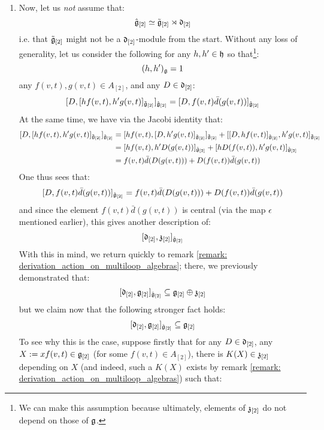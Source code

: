 \begin{remark}
\begin{enumerate}
                \item Now, let us \textit{not} assume that:
                    $$\hat{\mathfrak{g}}_{[2]} \simeq \tilde{\mathfrak{g}}_{[2]}\rtimes \mathfrak{d}_{[2]}$$
                i.e. that $\tilde{\mathfrak{g}}_{[2]}$ might not be a $\mathfrak{d}_{[2]}$-module from the start. Without any loss of generality, let us consider the following for any $h, h' \in \mathfrak{h}$ so that\footnote{We can make this assumption because ultimately, elements of $\mathfrak{z}_{[2]}$ do not depend on those of $\mathfrak{g}$.}:
                    $$(h, h')_{\mathfrak{g}} = 1$$
                any $f(v, t), g(v, t) \in A_{[2]}$, and any $D \in \mathfrak{d}_{[2]}$:
                    $$[ D, [h f(v, t), h' g(v, t)]_{\tilde{\mathfrak{g}}_{[2]}} ]_{\hat{\mathfrak{g}}_{[2]}} = [ D, f(v, t) \bar{d}( g(v, t) ) ]_{\hat{\mathfrak{g}}_{[2]}}$$
                At the same time, we have via the Jacobi identity that:
                    $$
                        \begin{aligned}
                            [ D, [h f(v, t), h' g(v, t)]_{\tilde{\g}_{[2]}} ]_{\hat{\g}_{[2]}} & = [ h f(v, t), [D, h' g(v, t)]_{\hat{\g}_{[2]}} ]_{\tilde{\g}_{[2]}} + [ [D, h f(v, t)]_{\hat{\g}_{[2]}}, h' g(v, t) ]_{\tilde{\g}_{[2]}}
                            \\
                            & = [ h f(v, t), h' D( g(v, t) ) ]_{\tilde{\g}_{[2]}} + [ h D( f(v, t) ), h' g(v, t) ]_{\tilde{\g}_{[2]}}
                            \\
                            & = f(v, t) \bar{d}( D( g(v, t) ) ) + D( f(v, t) ) \bar{d}(g(v, t))
                        \end{aligned}
                    $$
                One thus sees that:
                    $$[ D, f(v, t) \bar{d}( g(v, t) ) ]_{\hat{\mathfrak{g}}_{[2]}} = f(v, t) \bar{d}( D( g(v, t) ) ) + D( f(v, t) ) \bar{d}(g(v, t))$$
                and since the element $f(v, t) \bar{d}( g(v, t) )$ is central (via the map $\epsilon$ mentioned earlier), this gives another description of:
                    $$[ \mathfrak{d}_{[2]}, \mathfrak{z}_{[2]} ]_{\hat{\mathfrak{g}}_{[2]}}$$
                With this in mind, we return quickly to remark \ref{remark: derivation_action_on_multiloop_algebras}; there, we previously demonstrated that:
                    $$[ \mathfrak{d}_{[2]}, \mathfrak{g}_{[2]} ]_{\hat{\mathfrak{g}}_{[2]}} \subseteq \mathfrak{g}_{[2]} \oplus \mathfrak{z}_{[2]}$$
                but we claim now that the following stronger fact holds:
                    $$[ \mathfrak{d}_{[2]}, \mathfrak{g}_{[2]} ]_{\hat{\mathfrak{g}}_{[2]}} \subseteq \mathfrak{g}_{[2]}$$
                To see why this is the case, suppose firstly that for any $D \in \mathfrak{d}_{[2]}$, any $X := x f(v, t) \in \mathfrak{g}_{[2]}$ (for some $f(v, t) \in A_{[2]}$), there is $K(X) \in \mathfrak{z}_{[2]}$ depending on $X$ (and indeed, such a $K(X)$ exists by remark \ref{remark: derivation_action_on_multiloop_algebras}) such that:

\end{enumerate}
\end{remark}
